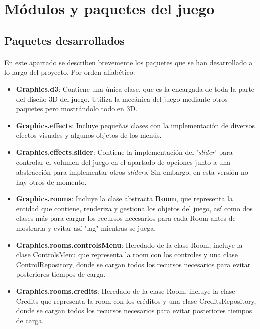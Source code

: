 \documentclass[a4paper]{article}
\begin{document}
\section{Módulos y paquetes del juego}

\subsection{Paquetes desarrollados}

\paragraph{}En este apartado se describen brevemente los paquetes que se han desarrollado a lo largo del proyecto. Por orden alfabético:
\begin{itemize}
	\item \textbf{Graphics.d3}: Contiene una única clase, que es la encargada de toda la parte del diseño 3D del juego. Utiliza la mecánica del juego mediante otros paquetes pero mostrándolo todo en 3D.
	
	\item \textbf{Graphics.effects}: Incluye pequeñas clases con la implementación de diversos efectos visuales y algunos objetos de los menús.
	\item \textbf{Graphics.effects.slider}: Contiene la implementación del '\textit{slider}' para controlar el volumen del juego en el apartado de opciones junto a una abstracción para implementar otros \textit{sliders}. Sin embargo, en esta versión no hay otros de momento.
	
	\item \textbf{Graphics.rooms}: Incluye la clase abstracta \textbf{Room}, que representa la entidad que contiene, renderiza y gestiona los objetos del juego, así como dos clases más para cargar los recursos necesarios para cada Room antes de mostrarla y evitar así "lag" mientras se juega.
	
	\item \textbf{Graphics.rooms.controlsMenu}: Heredado de la clase Room, incluye la clase ControlsMenu que representa la room con los controles y una clase ControlRepository, donde se cargan todos los recursos necesarios para evitar posteriores tiempos de carga.
	
	\item \textbf{Graphics.rooms.credits}: Heredado de la clase Room, incluye la clase Credits que representa la room con los créditos y una clase  CreditsRepository, donde se cargan todos los recursos necesarios para evitar posteriores tiempos de carga.
	

\end{itemize}
\end{document}

